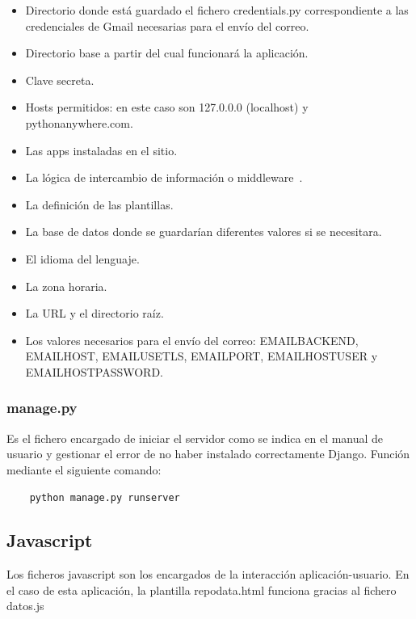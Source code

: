 \documentclass[a4paper, 12pt]{book}
\begin{document}
\begin{itemize}
	\item Directorio donde está guardado el fichero credentials.py correspondiente a las credenciales de Gmail necesarias para el envío del correo.
	\item Directorio base a partir del cual funcionará la aplicación.
	\item Clave secreta.
	\item Hosts permitidos: en este caso son 127.0.0.0 (localhost) y pythonanywhere.com.
	\item Las apps instaladas en el sitio.
	\item La lógica de intercambio de información o middleware~\cite{website:middleware}.
	\item La definición de las plantillas.
	\item La base de datos donde se guardarían diferentes valores si se necesitara.
	\item El idioma del lenguaje.
	\item La zona horaria.
	\item La URL y el directorio raíz.
	\item Los valores necesarios para el envío del correo: EMAIL\textunderscore BACKEND, EMAIL\textunderscore HOST, EMAIL\textunderscore USE\textunderscore TLS, EMAIL\textunderscore PORT, EMAIL\textunderscore HOST\textunderscore USER y EMAIL\textunderscore HOST\textunderscore PASSWORD.
\end{itemize}

\subsubsection{manage.py}

Es el fichero encargado de iniciar el servidor como se indica en el manual de usuario y gestionar el error de no haber instalado correctamente Django. Función mediante el siguiente comando:

\begin{verbatim}
	python manage.py runserver
\end{verbatim}

\subsection{Javascript}

Los ficheros javascript son los encargados de la interacción aplicación-usuario. En el caso de esta aplicación, la plantilla repo\textunderscore data.html funciona gracias al fichero datos.js
\end{document}

